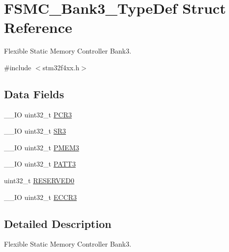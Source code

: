 \hypertarget{struct_f_s_m_c___bank3___type_def}{\section{F\-S\-M\-C\-\_\-\-Bank3\-\_\-\-Type\-Def Struct Reference}
\label{struct_f_s_m_c___bank3___type_def}
}


Flexible Static Memory Controller Bank3.  




{\ttfamily \#include $<$stm32f4xx.\-h$>$}

\subsection*{Data Fields}
\begin{DoxyCompactItemize}
\item 
\-\_\-\-\_\-\-I\-O uint32\-\_\-t \hyperlink{struct_f_s_m_c___bank3___type_def_a73861fa74b83973fa1b5f92735c042ef}{P\-C\-R3}
\item 
\-\_\-\-\_\-\-I\-O uint32\-\_\-t \hyperlink{struct_f_s_m_c___bank3___type_def_af30c34f7c606cb9416a413ec5fa36491}{S\-R3}
\item 
\-\_\-\-\_\-\-I\-O uint32\-\_\-t \hyperlink{struct_f_s_m_c___bank3___type_def_aba8981e4f06cfb3db7d9959242052f80}{P\-M\-E\-M3}
\item 
\-\_\-\-\_\-\-I\-O uint32\-\_\-t \hyperlink{struct_f_s_m_c___bank3___type_def_aba03fea9c1bb2242d963e29f1b94d25e}{P\-A\-T\-T3}
\item 
uint32\-\_\-t \hyperlink{struct_f_s_m_c___bank3___type_def_af86c61a5d38a4fc9cef942a12744486b}{R\-E\-S\-E\-R\-V\-E\-D0}
\item 
\-\_\-\-\_\-\-I\-O uint32\-\_\-t \hyperlink{struct_f_s_m_c___bank3___type_def_a6062be7dc144c07e01c303cb49d69ce2}{E\-C\-C\-R3}
\end{DoxyCompactItemize}


\subsection{Detailed Description}
Flexible Static Memory Controller Bank3. 

